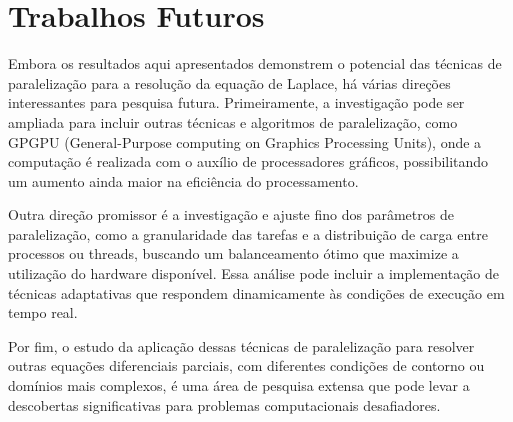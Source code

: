 \documentclass[conference]{IEEEtran}
\begin{document}
\section{Trabalhos Futuros}

Embora os resultados aqui apresentados demonstrem o potencial das técnicas de paralelização para a resolução da equação de Laplace, há várias direções interessantes para pesquisa futura. Primeiramente, a investigação pode ser ampliada para incluir outras técnicas e algoritmos de paralelização, como GPGPU (General-Purpose computing on Graphics Processing Units), onde a computação é realizada com o auxílio de processadores gráficos, possibilitando um aumento ainda maior na eficiência do processamento.

Outra direção promissor é a investigação e ajuste fino dos parâmetros de paralelização, como a granularidade das tarefas e a distribuição de carga entre processos ou threads, buscando um balanceamento ótimo que maximize a utilização do hardware disponível. Essa análise pode incluir a implementação de técnicas adaptativas que respondem dinamicamente às condições de execução em tempo real.

Por fim, o estudo da aplicação dessas técnicas de paralelização para resolver outras equações diferenciais parciais, com diferentes condições de contorno ou domínios mais complexos, é uma área de pesquisa extensa que pode levar a descobertas significativas para problemas computacionais desafiadores.



\end{document}
